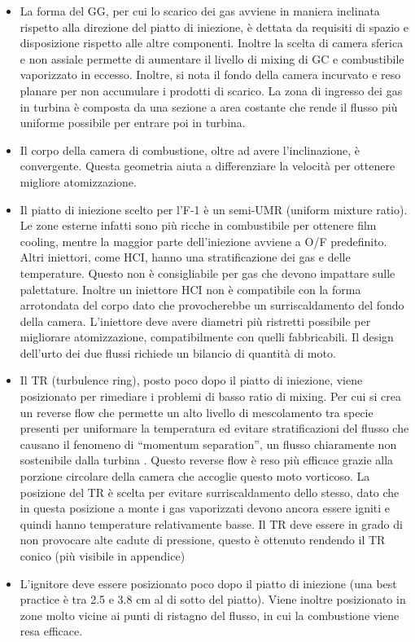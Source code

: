 \documentclass[11pt,a4paper,twocolumn]{article}
\begin{document}
\begin{itemize}[wide,itemsep=3pt,topsep=3pt]

\item
La forma del GG, per cui lo scarico dei gas avviene in maniera inclinata rispetto alla direzione del piatto di iniezione, è dettata da requisiti di spazio e disposizione rispetto alle altre componenti. Inoltre la scelta di camera sferica e non assiale permette di aumentare il livello di mixing di GC e combustibile vaporizzato in eccesso. Inoltre, si nota il fondo della camera incurvato e reso planare per non accumulare i prodotti di scarico. La zona di ingresso dei gas in turbina è composta da una sezione a area costante che rende il flusso più uniforme possibile per entrare poi in turbina.
\item
Il corpo della camera di combustione, oltre ad avere l’inclinazione, è convergente. Questa geometria aiuta a differenziare la velocità per ottenere migliore atomizzazione. 
\item
Il piatto di iniezione scelto per l’F-1 è un semi-UMR (uniform mixture ratio). Le zone esterne infatti sono più ricche in combustibile per ottenere film cooling, mentre la maggior parte dell’iniezione avviene a O/F predefinito. Altri iniettori, come HCI, hanno una stratificazione dei gas e delle temperature. Questo non è consigliabile per gas che devono impattare sulle palettature. Inoltre un iniettore HCI non è compatibile con la forma arrotondata del corpo dato che provocherebbe un surriscaldamento del fondo della camera. L’iniettore deve avere diametri più ristretti possibile per migliorare atomizzazione, compatibilmente con quelli fabbricabili. Il design dell’urto dei due flussi richiede un bilancio di quantità di moto. 
\item
Il TR (turbulence ring), posto poco dopo il piatto di iniezione, viene posizionato per rimediare i problemi di basso ratio di mixing. Per cui si crea un reverse flow che permette un alto livello di mescolamento tra specie presenti per uniformare la temperatura ed evitare stratificazioni del flusso che causano il fenomeno di “momentum separation”, un flusso chiaramente non sostenibile dalla turbina . Questo reverse flow è reso più efficace grazie alla porzione circolare della camera che accoglie questo moto vorticoso. La posizione del TR è scelta per evitare surriscaldamento dello stesso, dato che in questa posizione a monte i gas vaporizzati devono ancora essere igniti e quindi hanno temperature relativamente basse. Il TR deve essere in grado di non provocare alte cadute di pressione, questo è ottenuto rendendo il TR conico (più visibile in appendice)
\item
L’ignitore deve essere posizionato poco dopo il piatto di iniezione (una best practice è tra 2.5 e 3.8 cm al di sotto del piatto). Viene inoltre posizionato in zone molto vicine ai punti di ristagno del flusso, in cui la combustione viene resa efficace.


\end{itemize}
\end{document}
